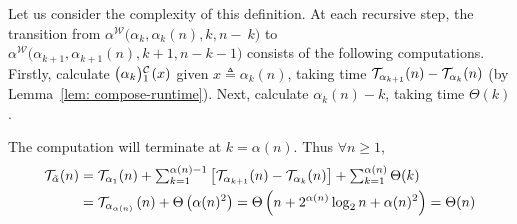 Let us consider the complexity of this definition.
At each recursive step, the transition from $\alpha^{\mathcal{W}}\big(\alpha_k, \alpha_k(n), k, n-~k\big)$ to $\alpha^{\mathcal{W}}\big(\alpha_{k+1}, \alpha_{k+1}(n), k+1, n-k-1\big)$ consists of the following computations. 
Firstly, calculate $\cdt{\big(\alpha_k\big)}{1}(x)$ given $x\triangleq \alpha_k(n)$, taking time $\mathcal{T}_{\alpha_{k+1}}(n) - \mathcal{T}_{\alpha_k}(n)$ (by Lemma~\ref{lem: compose-runtime}). Next, calculate $\alpha_k(n) - k$, taking time $\Theta(k)$.

The computation will terminate at $k = \alpha(n)$. Thus $\forall n\ge 1$,
\begin{equation} \label{eq: inv-ack-runtime-improved}
\begin{aligned}
\mathcal{T}_{\tilde{\alpha}}(n)
& = \textstyle \mathcal{T}_{\alpha_1}(n) + \sum_{k=1}^{\alpha(n) - 1}
\left[ \mathcal{T}_{\alpha_{k+1}}(n) - \mathcal{T}_{\alpha_k}(n)
\right] + \sum_{k=1}^{\alpha(n)}\Theta(k) \\
& = \mathcal{T}_{\alpha_{\alpha(n)}}\left(n\right) + \Theta\left(\alpha(n)^2\right)
= \Theta\left(n + 2^{\alpha(n)}\log_2n + \alpha(n)^2\right) = \Theta(n)
\end{aligned}
\end{equation}